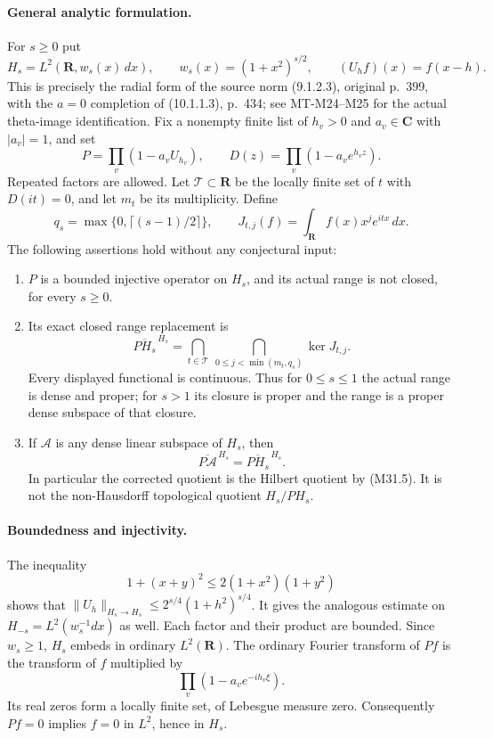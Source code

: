 \paragraph{General analytic formulation.}
For $s\geq0$ put
\[
 H_s=L^2(\mathbf R,w_s(x)\,dx),\qquad
 w_s(x)=(1+x^2)^{s/2},\qquad
 (U_hf)(x)=f(x-h).
 \tag{M31.2}
\]
This is precisely the radial form of the source norm
(9.1.2.3), original p.~399, with the $a=0$ completion
of (10.1.1.3), p.~434; see MT-M24--M25 for the actual
theta-image identification.  Fix a nonempty finite list
of $h_v>0$ and $a_v\in\mathbf C$ with $|a_v|=1$, and set
\[
 P=\prod_v(1-a_vU_{h_v}),\qquad
 D(z)=\prod_v(1-a_ve^{h_vz}).
 \tag{M31.3}
\]
Repeated factors are allowed.  Let $\mathcal T\subset\mathbf R$
be the locally finite set of $t$ with $D(it)=0$, and let
$m_t$ be its multiplicity.  Define
\[
 q_s=\max\{0,\lceil(s-1)/2\rceil\},\qquad
 J_{t,j}(f)=\int_{\mathbf R}f(x)x^je^{itx}\,dx.
 \tag{M31.4}
\]
The following assertions hold without any conjectural input:
\begin{enumerate}
\item $P$ is a bounded injective operator on $H_s$, and its
actual range is not closed, for every $s\geq0$.
\item Its exact closed range replacement is
\[
 \overline{P H_s}^{\,H_s}
 =\bigcap_{t\in\mathcal T}\ \bigcap_{0\leq j<\min(m_t,q_s)}
            \ker J_{t,j}.
 \tag{M31.5}
\]
Every displayed functional is continuous.  Thus for $0\leq s\leq1$
the actual range is dense and proper; for $s>1$ its closure
is proper and the range is a proper dense subspace of that closure.
\item If $\mathcal A$ is any dense linear subspace of $H_s$, then
\[
 \overline{P\mathcal A}^{\,H_s}
       =\overline{PH_s}^{\,H_s}.
 \tag{M31.6}
\]
In particular the corrected quotient is the Hilbert quotient by
(M31.5).  It is not the non-Hausdorff topological quotient
$H_s/PH_s$.
\end{enumerate}

\paragraph{Boundedness and injectivity.}
The inequality
\[
 1+(x+y)^2\leq2(1+x^2)(1+y^2)
 \tag{M31.7}
\]
shows that $\|U_h\|_{H_s\to H_s}\leq
2^{s/4}(1+h^2)^{s/4}$.  It gives the analogous estimate
on $H_{-s}=L^2(w_s^{-1}dx)$ as well.  Each factor and
their product are bounded.  Since $w_s\geq1$, $H_s$
embeds in ordinary $L^2(\mathbf R)$.  The ordinary Fourier
transform of $Pf$ is the transform of $f$ multiplied by
\[
            \prod_v(1-a_ve^{-ih_v\xi}).
\]
Its real zeros form a locally finite set, of Lebesgue measure
zero.  Consequently $Pf=0$ implies $f=0$ in $L^2$,
hence in $H_s$.

